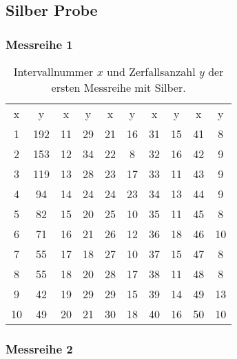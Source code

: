 \subsection{Silber Probe}

\subsubsection{Messreihe 1}

\begin{table}[H]
    \centering
    \caption[short]{Intervallnummer $x$ und Zerfallsanzahl $y$ der ersten Messreihe mit Silber.}
    \label{tab:silber1}
    \begin{tabular}{S S[table-format=3.0] S S S S S S S S}
        \toprule
        {x} & {y} & {x} & {y} & {x} & {y} & {x} & {y} & {x} & {y} \\
        \cmidrule(lr){1-2} \cmidrule(lr){3-4} \cmidrule(lr){5-6}  \cmidrule(lr){7-8} \cmidrule(lr){9-10}
        1 & 192 & 11 & 29 & 21 & 16 & 31 & 15 & 41 &  8 \\
        2 & 153 & 12 & 34 & 22 &  8 & 32 & 16 & 42 &  9 \\
        3 & 119 & 13 & 28 & 23 & 17 & 33 & 11 & 43 &  9 \\
        4 &  94 & 14 & 24 & 24 & 23 & 34 & 13 & 44 &  9 \\
        5 &  82 & 15 & 20 & 25 & 10 & 35 & 11 & 45 &  8 \\
        6 &  71 & 16 & 21 & 26 & 12 & 36 & 18 & 46 & 10 \\
        7 &  55 & 17 & 18 & 27 & 10 & 37 & 15 & 47 &  8 \\
        8 &  55 & 18 & 20 & 28 & 17 & 38 & 11 & 48 &  8 \\
        9 &  42 & 19 & 29 & 29 & 15 & 39 & 14 & 49 & 13 \\
       10 &  49 & 20 & 21 & 30 & 18 & 40 & 16 & 50 & 10 \\
        \bottomrule
    \end{tabular}
\end{table}

\subsubsection{Messreihe 2}

